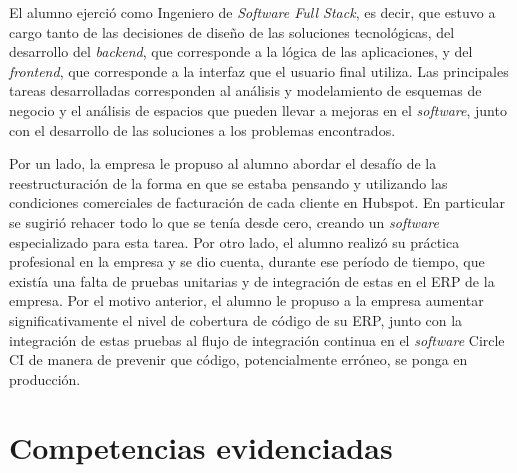     El alumno ejerció como Ingeniero de \textit{Software Full Stack}, es decir, que estuvo a cargo tanto de las decisiones de diseño de las soluciones tecnológicas, del desarrollo del \textit{backend}, que corresponde a la lógica de las aplicaciones, y del \textit{frontend}, que corresponde a la interfaz que el usuario final utiliza. Las principales tareas desarrolladas corresponden al análisis y modelamiento de esquemas de negocio y el análisis de espacios que pueden llevar a mejoras en el \textit{software}, junto con el desarrollo de las soluciones a los problemas encontrados.
    
    Por un lado, la empresa le propuso al alumno abordar el desafío de la reestructuración de la forma en que se estaba pensando y utilizando las condiciones comerciales de facturación de cada cliente en Hubspot. En particular se sugirió rehacer todo lo que se tenía desde cero, creando un \textit{software} especializado para esta tarea. Por otro lado, el alumno realizó su práctica profesional en la empresa y se dio cuenta, durante ese período de tiempo, que existía una falta de pruebas unitarias y de integración de estas en el ERP de la empresa. Por el motivo anterior, el alumno le propuso a la empresa aumentar significativamente el nivel de cobertura de código de su ERP, junto con la integración de estas pruebas al flujo de integración continua en el \textit{software} Circle CI de manera de prevenir que código, potencialmente erróneo, se ponga en producción.



\section{Competencias evidenciadas}
    \label{competencias}


